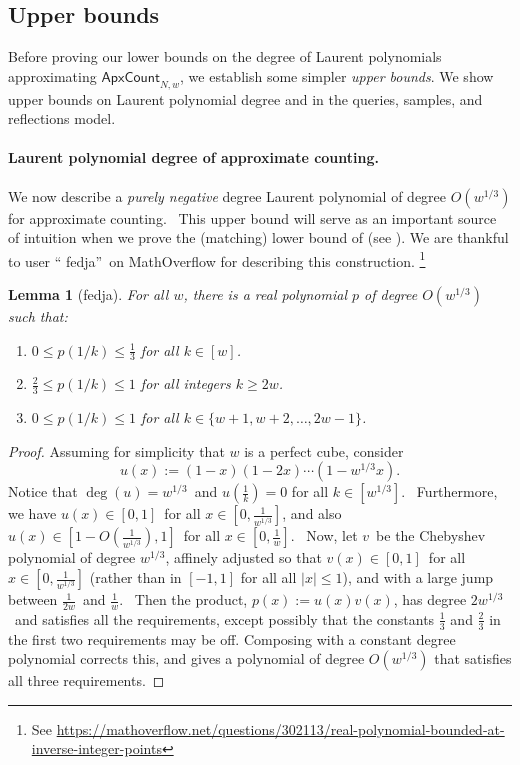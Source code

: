 \documentclass[10pt,a4paper]{article}
\newtheorem{lemma}[theorem]{Lemma}
\newcommand{\<}{\langle}
\renewcommand{\>}{\rangle}
\newcommand{\para}[1]{\paragraph{#1}}
\begin{document}
%
\subsection{Upper bounds}
\label{UPPER}\label{sec:upper}

Before proving our lower bounds on the degree of 
Laurent polynomials approximating $\mathsf{ApxCount}_{N,w}$, we
establish some simpler \emph{upper bounds}.
We show upper bounds on Laurent polynomial degree and in the 
queries, samples, and reflections model.

\para{Laurent polynomial degree of approximate counting.}
We now describe a \emph{purely negative} degree Laurent polynomial of degree $O(w^{1/3})$ for
approximate counting. \ This upper bound will serve as an important source
of intuition when we prove the (matching) lower bound of 
(see ). We are thankful to user \textquotedblleft
fedja\textquotedblright\ on MathOverflow for describing this construction.
\footnote{
See 
\url{https://mathoverflow.net/questions/302113/real-polynomial-bounded-at-inverse-integer-points}
}

\begin{lemma}[fedja]
\label{fedjatight} For all $w$, there is a real polynomial $p$ of degree $O\left(w^{1/3}\right)$ such that:
\begin{enumerate}
\item $0 \le p(1/k) \le \frac{1}{3}$ for all $k \in [w]$.
\item $\frac{2}{3} \le p(1/k) \le 1$ for all integers $k \ge 2w$.
\item $0 \le p(1/k) \le 1$ for all $k \in \{w+1,w+2,\ldots,2w-1\}$.
\end{enumerate}
\end{lemma}

\begin{proof}
Assuming for simplicity that $w$ is a perfect cube, consider
\begin{equation}
u\left(  x\right)  :=\left(  1-x\right)  \left(  1-2x\right)  \cdots\left(
1-w^{1/3}x\right)  .
\end{equation}
Notice that $\deg\left(  u\right)  =w^{1/3}$\ and $u\left(  \frac{1}
{k}\right)  =0$ for all $k\in\left[  w^{1/3}\right]  $. \ Furthermore, we have
$u\left(  x\right) \in [0,1]$\ for all $x\in\left[
0,\frac{1}{w^{1/3}}\right]  $, and also $u\left(  x\right)  \in\left[
1-O\left(  \frac{1}{w^{1/3}}\right)  ,1\right]  $\ for all $x\in\left[
0,\frac{1}{w}\right]  $. \ Now, let $v$\ be the Chebyshev polynomial of degree
$w^{1/3}$, affinely adjusted so that $v\left(  x\right)
\in [0,1]$\ for all $x\in\left[  0,\frac{1}{w^{1/3}}\right]  $ (rather
than in $[-1,1]$ for all all $\left\vert x\right\vert \leq1$), and with a large jump between
$\frac{1}{2w}$\ and $\frac{1}{w}$. \ Then the product, $p(x):=u\left(  x\right)  v\left(  x\right)  $, has degree $2w^{1/3}$\ and
satisfies all the requirements, except possibly that the constants $\frac{1}{3}$ and $\frac{2}{3}$ in the first two requirements may be off. Composing with a constant degree polynomial corrects this, and gives a polynomial of degree $O(w^{1/3})$ that satisfies all three requirements.
\end{proof}
\end{document}
